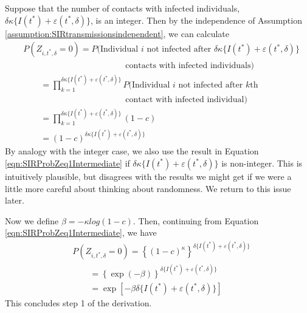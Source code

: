 \documentclass[fleqn]{article}\usepackage[]{graphicx}\usepackage[]{color}
\begin{document}
Suppose that the number of contacts with infected individuals, $\delta \kappa \{ I(t^*) + \varepsilon(t^*, \delta) \}$, is an integer.  Then by the independence of Assumption \ref{assumption:SIRtransmissionsindependent}, we can calculate
\begin{align}
&P(Z_{i, t^*, \delta} = 0) = P(\text{Individual $i$ not infected after $\delta \kappa \{ I(t^*) + \varepsilon(t^*, \delta) \}$} \nonumber \\
&\qquad \qquad \qquad \qquad \qquad \qquad \text{contacts with infected individuals}) \nonumber \\
&\qquad = \prod_{k = 1}^{\delta \kappa \{ I(t^*) + \varepsilon(t^*, \delta) \}} P(\text{Individual $i$ not infected after $k$th } \nonumber \\
&\qquad \qquad \qquad \qquad \qquad \qquad \text{contact with infected individual}) \nonumber \\
&\qquad = \prod_{k = 1}^{\delta \kappa \{ I(t^*) + \varepsilon(t^*, \delta) \}} (1 - c) \nonumber \\
&\qquad = (1 - c)^{\delta \kappa \{ I(t^*) + \varepsilon(t^*, \delta) \}} \label{eqn:SIRProbZeq1Intermediate}
\end{align}
By analogy with the integer case, we also use the result in Equation \eqref{eqn:SIRProbZeq1Intermediate} if $\delta \kappa \{ I(t^*) + \varepsilon(t^*, \delta) \}$ is non-integer.  This is intuitively plausible, but disagrees with the results we might get if we were a little more careful about thinking about randomness.  We return to this issue later.

Now we define $\beta = -\kappa log(1 - c)$.  Then, continuing from Equation \eqref{eqn:SIRProbZeq1Intermediate}, we have
\begin{align}
&P(Z_{i, t^*, \delta} = 0) = \left\{ (1 - c)^{\kappa} \right\}^{\delta \{ I(t^*) + \varepsilon(t^*, \delta) \}} \nonumber \\
&\qquad = \left\{ \exp(- \beta) \right\}^{\delta \{ I(t^*) + \varepsilon(t^*, \delta) \}} \nonumber \\
&\qquad = \exp \left[ - \beta \delta \{ I(t^*) + \varepsilon(t^*, \delta) \} \right] \label{eqn:SIRProbZeq1Beta}
\end{align}
This concludes step 1 of the derivation.
\end{document}
